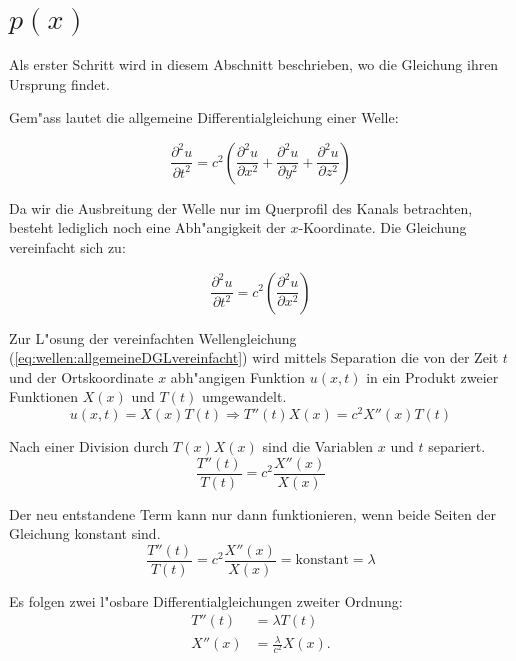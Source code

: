 \section{\texorpdfstring{$p(x)$}{p(x)}}
Als erster Schritt wird in diesem Abschnitt beschrieben, wo die Gleichung ihren 
Ursprung findet.

Gem"ass \cite{wellen:smirnow2} lautet die allgemeine Differentialgleichung 
einer Welle:

\begin{equation*}
	\frac{\partial^2 u}{\partial t^2}
	=
	c^2
	\left(
		\frac{\partial^2 u}{\partial x^2} 
		+ \frac{\partial^2 u}{\partial y^2} 
		+ \frac{\partial^2 u}{\partial z^2}
	\right)
	\label{eq:wellen:allgemeineDGL}
\end{equation*}

Da wir die Ausbreitung der Welle nur im Querprofil des Kanals betrachten, 
besteht lediglich noch eine Abh"angigkeit der $x$-Koordinate. Die Gleichung 
vereinfacht sich zu:

\begin{equation}
	\frac{\partial^2 u}{\partial t^2}
	=
	c^2
	\left(
		\frac{\partial^2 u}{\partial x^2} 
	\right)
	\label{eq:wellen:allgemeineDGLvereinfacht}
\end{equation}

Zur L"osung der vereinfachten Wellengleichung 
(\ref{eq:wellen:allgemeineDGLvereinfacht}) wird mittels Separation die von der 
Zeit $t$ und der Ortskoordinate $x$ abh"angigen Funktion $u(x,t)$ in ein 
Produkt zweier Funktionen $X(x)$ und $T(t)$ umgewandelt.
\begin{equation*}
	u (x,t) = X(x) T(t)
	\Rightarrow T''(t) X(x) = c^2 X''(x)T(t)
\end{equation*}

Nach einer Division durch $T(x)X(x)$ sind die Variablen $x$ und $t$ separiert.
\begin{equation*}
	\frac{T''(t)}{T(t)}
	=
	c^2 \frac{X''(x)}{X(x)}
\end{equation*}

Der neu entstandene Term kann nur dann funktionieren, wenn beide Seiten der 
Gleichung konstant sind.
\begin{equation*}
	\frac{T''(t)}{T(t)}
	=
	c^2 \frac{X''(x)}{X(x)} = \text{konstant} = \lambda
\end{equation*}

Es folgen zwei l"osbare Differentialgleichungen zweiter Ordnung:
\begin{align*}
	T''(t) &= \lambda T(t) \\
	X''(x) &= \frac{\lambda}{c^2}X(x).
\end{align*}

